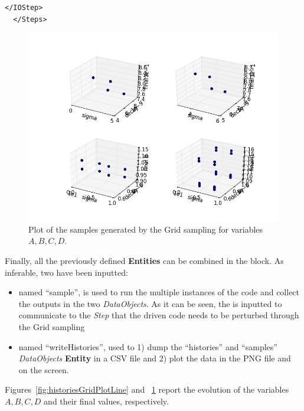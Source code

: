 \begin{enumerate}
\begin{lstlisting}[style=XML,morekeywords={arg,extension,pauseAtEnd,overwrite}]
    </IOStep>
  </Steps>
\end{lstlisting}
 \begin{figure}[h!]
  \centering
  \includegraphics[scale=0.7]{pics/Grid_pointsets.png}
  \caption{Plot of the samples generated by the Grid sampling for variables $A,B,C,D$.}
  \label{fig:samplesGridPlotLine}
 \end{figure}
   Finally, all the previously defined \textbf{Entities} can be combined in 
   the  block. As inferable, 
   two  have been inputted:
   \begin{itemize}
     \item {} named ``sample'', is used to run the multiple  
     instances of the code and 
     collect the outputs in the two \textit{DataObjects}. As it can be
     seen, the  is inputted to communicate to the 
     \textit{Step} that the driven code needs to
     be perturbed through the Grid sampling
     \item  {} named ``writeHistories'', used to 1) dump 
     the ``histories'' and ``samples'' \textit{DataObjects} 
     \textbf{Entity} in a CSV file and 2) plot the data in the PNG file and 
     on the screen.
   \end{itemize}
\end{enumerate} 
 Figures~\ref{fig:historiesGridPlotLine} and ~\ref{fig:samplesGridPlotLine}  report the evolution of the 
 variables $A,B,C,D$ and their final values, respectively.

